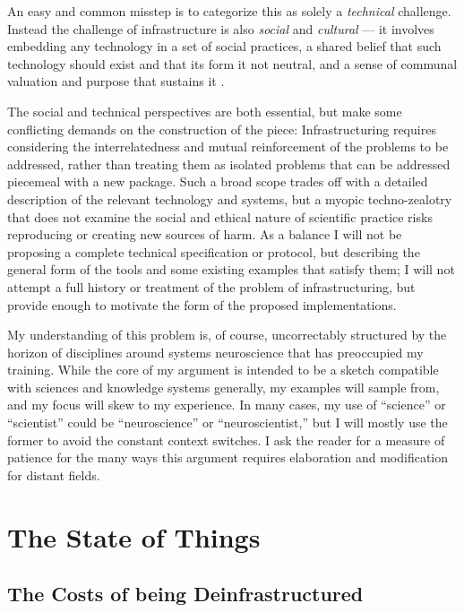 \documentclass[11pt]{article}
\begin{document}
\begin{multicols}{2}
An easy and common misstep is to categorize this as solely a
\emph{technical} challenge. Instead the challenge of infrastructure is
also \emph{social} and \emph{cultural} --- it involves embedding any
technology in a set of social practices, a shared belief that such
technology should exist and that its form it not neutral, and a sense of
communal valuation and purpose that sustains it \cite{bietzSustainingDevelopmentCyberinfrastructure2012} .

The social and technical perspectives are both essential, but make some
conflicting demands on the construction of the piece: Infrastructuring
requires considering the interrelatedness and mutual reinforcement of
the problems to be addressed, rather than treating them as isolated
problems that can be addressed piecemeal with a new package. Such a
broad scope trades off with a detailed description of the relevant
technology and systems, but a myopic techno-zealotry that does not
examine the social and ethical nature of scientific practice risks
reproducing or creating new sources of harm. As a balance I will not be
proposing a complete technical specification or protocol, but describing
the general form of the tools and some existing examples that satisfy
them; I will not attempt a full history or treatment of the problem of
infrastructuring, but provide enough to motivate the form of the
proposed implementations.

My understanding of this problem is, of course, uncorrectably structured
by the horizon of disciplines around systems neuroscience that has
preoccupied my training. While the core of my argument is intended to be
a sketch compatible with sciences and knowledge systems generally, my
examples will sample from, and my focus will skew to my experience. In
many cases, my use of ``science'' or ``scientist'' could be
``neuroscience'' or ``neuroscientist,'' but I will mostly use the former
to avoid the constant context switches. I ask the reader for a measure
of patience for the many ways this argument requires elaboration and
modification for distant fields. 
\end{multicols}


\hypertarget{the-state-of-things}{%
\section{The State of Things}\label{the-state-of-things}}

\hypertarget{the-costs-of-being-deinfrastructured}{%
\subsection{The Costs of being
Deinfrastructured}\label{the-costs-of-being-deinfrastructured}}
\end{document}
